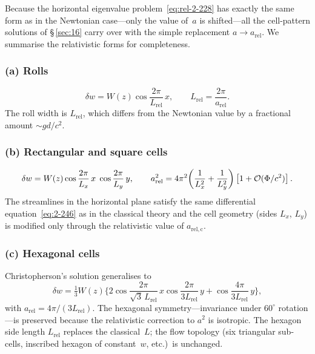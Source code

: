 Because the horizontal eigenvalue problem~\eqref{eq:rel-2-228} has
exactly the same form as in the Newtonian case---only the value
of~$a$ is shifted---all the cell-pattern solutions of \S\,\ref{sec:16}
carry over with the simple replacement
$a\to a_{\mathrm{rel}}$.  We summarise the relativistic forms for
completeness.

\subsubsection*{(a) Rolls}

\begin{equation}
\label{eq:rel-2-233}
\delta w = W(z)\cos\frac{2\pi}{L_{\mathrm{rel}}}\,x,
\qquad
L_{\mathrm{rel}} = \frac{2\pi}{a_{\mathrm{rel}}}.
\end{equation}
The roll width is $L_{\mathrm{rel}}$, which differs from the
Newtonian value by a fractional amount $\sim gd/c^{2}$.

\subsubsection*{(b) Rectangular and square cells}

\begin{equation}
\label{eq:rel-2-236}
\delta w = W(z)\cos\frac{2\pi}{L_{x}}\,x\;\cos\frac{2\pi}{L_{y}}\,y,
\qquad
a_{\mathrm{rel}}^{2}
  = 4\pi^{2}\!\left(\frac{1}{L_{x}^{2}}+\frac{1}{L_{y}^{2}}\right)
    \left[1 + \mathcal{O}(\Phi/c^{2})\right].
\end{equation}
The streamlines in the horizontal plane satisfy the same differential
equation~\eqref{eq:2-246} as in the classical theory and the
cell geometry (sides $L_{x}$, $L_{y}$) is modified only through the
relativistic value of $a_{\mathrm{rel,c}}$.

\subsubsection*{(c) Hexagonal cells}

Christopherson's solution generalises to
\begin{equation}
\label{eq:rel-2-248}
\delta w = \tfrac{1}{3}W(z)\biggl\{
  2\cos\frac{2\pi}{\sqrt{3}\,L_{\mathrm{rel}}}\,x
   \cos\frac{2\pi}{3L_{\mathrm{rel}}}\,y
  + \cos\frac{4\pi}{3L_{\mathrm{rel}}}\,y
\biggr\},
\end{equation}
with $a_{\mathrm{rel}}=4\pi/(3L_{\mathrm{rel}})$.  The hexagonal
symmetry---invariance under $60^{\circ}$ rotation---is preserved because
the relativistic correction to $a^{2}$ is isotropic.  The hexagon side
length $L_{\mathrm{rel}}$ replaces the classical~$L$; the flow topology
(six triangular sub-cells, inscribed hexagon of constant~$w$, etc.)\ is
unchanged.

